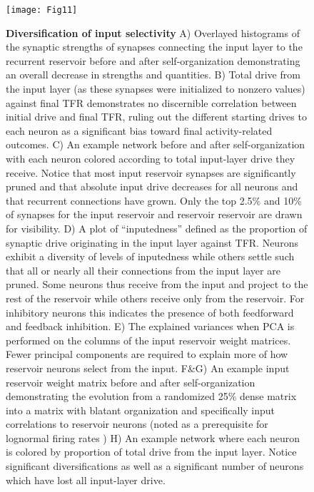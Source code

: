 \documentclass[10pt,letterpaper]{article}
\begin{document}
\begin{figure}
	\centering
	\texttt{[image: Fig11]}
	\caption{{\bf Diversification of input selectivity}
		A) Overlayed histograms of the synaptic strengths of synapses connecting the input layer to the recurrent reservoir before and after self-organization demonstrating an overall decrease in strengths and quantities. B) Total drive from the input layer (as these synapses were initialized to nonzero values) against final TFR demonstrates no discernible correlation between initial drive and final TFR, ruling out the different starting drives to each neuron as a significant bias toward final activity-related outcomes. C) An example network before and after self-organization with each neuron colored according to total input-layer drive they receive. Notice that most input \textrightarrow reservoir synapses are significantly pruned and that absolute input drive decreases for all neurons and that recurrent connections have grown. Only the top 2.5\% and 10\% of synapses for the input \textrightarrow reservoir and reservoir \textrightarrow reservoir are drawn for visibility. D) A plot of ``inputedness'' defined as the proportion of synaptic drive originating in the input layer against TFR. Neurons exhibit a diversity of levels of inputedness while others settle such that all or nearly all their connections from the input layer are pruned. Some neurons thus receive from the input and project to the rest of the reservoir while others receive only from the reservoir. For inhibitory neurons this indicates the presence of both feedforward and feedback inhibition. E) The explained variances when PCA is performed on the columns of the input \textrightarrow reservoir weight matrices. Fewer principal components are required to explain more of how reservoir neurons select from the input. F\&G) An example input \textrightarrow reservoir weight matrix before and after self-organization demonstrating the evolution from a randomized 25\% dense matrix into a matrix with blatant organization and specifically input correlations to reservoir neurons (noted as a prerequisite for lognormal firing rates \cite{koulakov2009correlated}) H) An example network where each neuron is colored by proportion of total drive from the input layer. Notice significant diversifications as well as a significant number of neurons which have lost all input-layer drive.    }
	\label{Fig11}
\end{figure}
\end{document}

